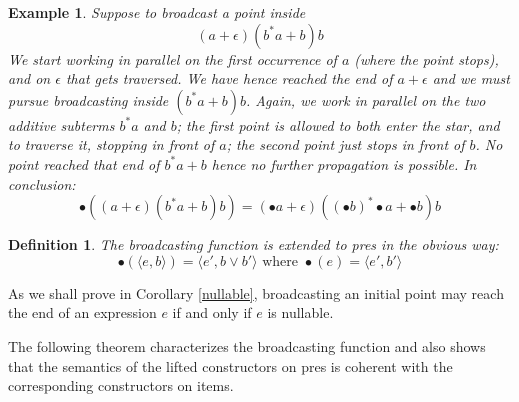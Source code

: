 \documentclass[preprint]{sigplanconf}
\newcounter{item}
\newtheorem{definition}[item]{Definition}
\newtheorem{example}[item]{Example}
\begin{document}
\begin{example}
Suppose to broadcast a point inside 
\[(a + \epsilon)(b^*a + b)b\]
We start working in parallel on the first 
occurrence of $a$ (where the point stops), and on $\epsilon$ that
gets traversed. We have hence reached the end of $a + \epsilon$ and
we must pursue broadcasting inside $(b^*a + b)b$. Again, we work
in parallel on the two additive subterms $b^*a$ and $b$; the first
point is allowed to both enter the star, and to traverse it,
stopping in front of $a$; the second point just stops in front of
$b$. No point reached that end of $b^*a + b$ hence no further 
propagation is possible.
In conclusion:
\[\bullet((a + \epsilon)(b^*a + b)b) =
(\bullet a + \epsilon)((\bullet b)^*\bullet a + \bullet b)b\]
\end{example}

\begin{definition} The broadcasting function is extended to pres 
in the obvious way:
\[\bullet(\langle e,b\rangle) = 
\langle e',b\vee b' \rangle \mbox{ where }
\bullet(e) = \langle e',b'\rangle\]
\end{definition}

\noindent
As we shall prove in Corollary \ref{nullable}, broadcasting an initial 
point may reach the end of an expression $e$ if and only if $e$ 
is nullable.



\noindent



\noindent
The following theorem characterizes the broadcasting function and also
shows that the semantics of the lifted constructors on
pres is coherent with the corresponding constructors on items.
\end{document}
